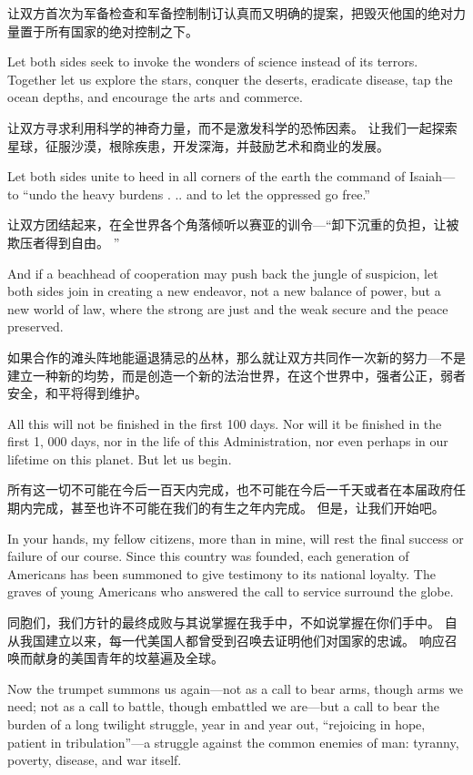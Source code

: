\documentclass[cs4size, a4paper, 12pt]{article}
\newcounter{numpar}
\newcommand*{\newpar}{\numpar{}}
\begin{document}
	让双方首次为军备检查和军备控制制订认真而又明确的提案，把毁灭他国的绝对力量置于所有国家的绝对控制之下。 
	
	\newpar Let both sides seek to invoke the wonders of science instead of its terrors. Together let us explore the stars, conquer the deserts, eradicate disease, tap the ocean depths, and encourage the arts and commerce.
	
	让双方寻求利用科学的神奇力量，而不是激发科学的恐怖因素。 让我们一起探索星球，征服沙漠，根除疾患，开发深海，并鼓励艺术和商业的发展。 
	
	\newpar Let both sides unite to heed in all corners of the earth the command of Isaiah—to ``undo the heavy burdens . .. and to let the oppressed go free.''
	
	让双方团结起来，在全世界各个角落倾听以赛亚的训令—``卸下沉重的负担，让被欺压者得到自由。 ''
	
	\newpar And if a beachhead of cooperation may push back the jungle of suspicion, let both sides join in creating a new endeavor, not a new balance of power, but a new world of law, where the strong are just and the weak secure and the peace preserved.
	
	如果合作的滩头阵地能逼退猜忌的丛林，那么就让双方共同作一次新的努力—不是建立一种新的均势，而是创造一个新的法治世界，在这个世界中，强者公正，弱者安全，和平将得到维护。 
	
	\newpar All this will not be finished in the first 100 days. Nor will it be finished in the first 1, 000 days, nor in the life of this Administration, nor even perhaps in our lifetime on this planet. But let us begin.
	
	所有这一切不可能在今后一百天内完成，也不可能在今后一千天或者在本届政府任期内完成，甚至也许不可能在我们的有生之年内完成。 但是，让我们开始吧。 
	
	\newpar In your hands, my fellow citizens, more than in mine, will rest the final success or failure of our course. Since this country was founded, each generation of Americans has been summoned to give testimony to its national loyalty. The graves of young Americans who answered the call to service surround the globe.
	
	同胞们，我们方针的最终成败与其说掌握在我手中，不如说掌握在你们手中。 自从我国建立以来，每一代美国人都曾受到召唤去证明他们对国家的忠诚。 响应召唤而献身的美国青年的坟墓遍及全球。 
	
	\newpar Now the trumpet summons us again—not as a call to bear arms, though arms we need; not as a call to battle, though embattled we are—but a call to bear the burden of a long twilight struggle, year in and year out, ``rejoicing in hope, patient in tribulation''—a struggle against the common enemies of man: tyranny, poverty, disease, and war itself.
	
\end{document}
